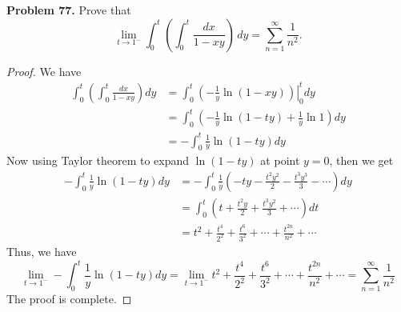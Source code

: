 \documentclass[12pt,leqno]{amsart}
\begin{document}
\medskip

\noindent
{\bf Problem 77.}
Prove that
$$
\lim_{t\to 1^-}\int_0^t\left(\int_0^t\frac{dx}{1-xy}\right)\, dy=\sum_{n=1}^\infty\frac{1}{n^2}.
$$
\begin{proof}
We have 
\begin{align*}
    \int_0^t\left(\int_0^t\frac{dx}{1-xy}\right) dy & = \int_0^t \left. \left(-\frac{1}{y}\ln (1-xy)\right)\right|^t_0 dy \\
    & = \int_0^t \left(-\frac{1}{y}\ln (1 - ty) + \frac{1}{y}\ln 1\right) dy \\
    & = - \int_0^t \frac{1}{y}\ln (1 - ty) dy
\end{align*}
Now using Taylor theorem to expand $\ln (1 - ty)$ at point $y=0$, then we get 
\begin{align*}
    - \int_0^t \frac{1}{y}\ln (1 - ty) dy & = - \int_0^t \frac{1}{y}\left(-ty - \frac{t^2y^2}{2} - \frac{t^3y^3}{3} - \cdots \right) dy \\
    & = \int_0^t \left(t + \frac{t^2y}{2} + \frac{t^3y^2}{3} + \cdots \right) dt \\
    & = t^2 + \frac{t^4}{2^2} + \frac{t^6}{3^2} + \cdots + \frac{t^{2n}}{n^2} +\cdots
\end{align*}
Thus, we have $$\lim_{t\to 1^-} - \int_0^t \frac{1}{y}\ln (1 - ty) dy = \lim_{t\to 1^-} t^2 + \frac{t^4}{2^2} + \frac{t^6}{3^2} + \cdots + \frac{t^{2n}}{n^2} +\cdots = \sum^\infty_{n=1}\frac{1}{n^2}$$ 
The proof is complete.
\end{proof}

\medskip
\end{document}
